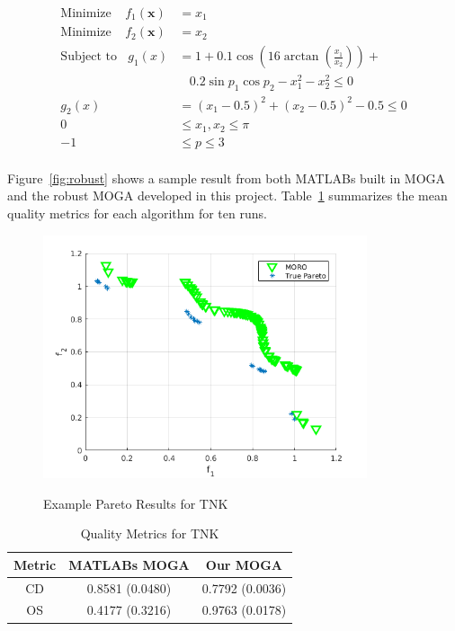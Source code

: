 \documentclass{article}
\begin{document}
\begin{align*}
\textrm{Minimize} ~~~~~ f_1(\textbf{x}) &= x_1 \\
\textrm{Minimize} ~~~~~ f_2(\textbf{x}) &= x_2 \\
\textrm{Subject to} ~~~~ g_1(x) &= 1+0.1\cos(16\arctan(\frac{x_1}{x_2})) + \\
&~~~~ 0.2\sin{p_1}\cos{p_2} -x_1^2-x_2^2\leq 0 \\
g_2(x) &= (x_1 - 0.5)^2 + (x_2 - 0.5)^2 -0.5 \leq 0 \\
0 &\leq  x_1,x_2 \leq \pi \\
-1& \leq p \leq 3\\
\end{align*}

Figure~\ref{fig:robust} shows a sample result from both MATLABs built in MOGA and the robust MOGA developed in this project. Table~\ref{tab:robustTNK} summarizes the mean quality metrics for each algorithm for ten runs.
\begin{figure}[h]
  \caption{Example Pareto Results for TNK}
  \centering
  \includegraphics[width=0.85\textwidth]{prob7_nChr25_nRun400.png}  
  \label{fig:robustTNK}
\end{figure}

\begin{table}[h]
\caption{Quality Metrics for TNK} 
\centering 
\begin{tabular}{|c|c|c|} 
\hline\hline  
Metric & MATLABs MOGA & Our MOGA \\ \hline
CD &  0.8581 (0.0480) & 0.7792 (0.0036) \\ \hline
OS & 0.4177 (0.3216) & 0.9763 (0.0178)\\ \hline
\end{tabular}
\label{tab:robustTNK} 
\end{table}
 
\end{document}
